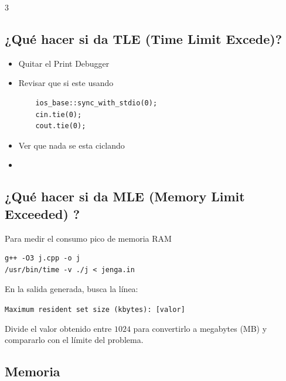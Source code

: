 \documentclass[8pt, spanish, mexico, letterpaper]{extarticle}
\newcommand{\naranja}[1]{\textcolor{orange!50!red!80!black}{#1}}
\newcommand{\<}{<}
\begin{document}
\begin{multicols*}{3}
\subsection*{¿Qué hacer si da \textbf{\naranja{TLE} (\naranja Time \naranja Limit \naranja Excede)}? }
\begin{itemize}
    \item Quitar el Print Debugger 
    \item   Revisar que si este usando
    \begin{verbatim}
    ios_base::sync_with_stdio(0);
    cin.tie(0);
    cout.tie(0);
    \end{verbatim}
    \item Ver que nada se esta ciclando
    \item 
\end{itemize}


\subsection*{¿Qué hacer si da \textbf{\naranja{MLE} (\naranja Memory   \naranja Limit \naranja  Exceeded) }? }
Para medir el consumo pico de memoria RAM
\begin{verbatim}
g++ -O3 j.cpp -o j
/usr/bin/time -v ./j < jenga.in
\end{verbatim}

En la salida generada, busca la línea:
\begin{center}
\texttt{Maximum resident set size (kbytes): [valor]}
\end{center}
Divide el valor obtenido entre $1024$ para convertirlo a megabytes (MB) y compararlo con el límite del problema.

\subsection*{Memoria}


\end{multicols*}
\end{document}
